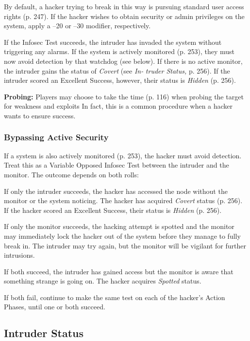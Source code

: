 By default, a hacker trying to break in this way is 
pursuing standard user access rights (p. 247). If the 
hacker wishes to obtain security or admin privileges on 
the system, apply a –20 or –30 modifier, respectively.

If the Infosec Test succeeds, the intruder has invaded 
the system without triggering any alarms. If the system is 
actively monitored (p. 253), they must now avoid detection
by that watchdog (see below). If there is no active
monitor, the intruder gains the status of \textit{Covert} (see \textit{In-}
\textit{truder Status,} p. 256). If the intruder scored an Excellent 
Success, however, their status is \textit{Hidden }(p. 256).

\textbf{Probing:} Players may choose to take the time (p. 
116) when probing the target for weakness and exploits
In fact, this is a common procedure when a
hacker wants to ensure success.

\subsubsection{Bypassing Active Security}

If a system is also actively monitored (p. 253), the 
hacker must avoid detection. Treat this as a Variable 
Opposed Infosec Test between the intruder and the 
monitor. The outcome depends on both rolls:

If only the intruder succeeds, the hacker has accessed
the node without the monitor or the system
noticing. The hacker has acquired \textit{Covert} status (p. 
256). If the hacker scored an Excellent Success, their 
status is \textit{Hidden }(p. 256).

If only the monitor succeeds, the hacking attempt 
is spotted and the monitor may immediately lock the 
hacker out of the system before they manage to fully 
break in. The intruder may try again, but the monitor 
will be vigilant for further intrusions.

If both succeed, the intruder has gained access but 
the monitor is aware that something strange is going 
on. The hacker acquires \textit{Spotted} status.

If both fail, continue to make the same test on each 
of the hacker's Action Phases, until one or both succeed.

\subsection{Intruder Status}

